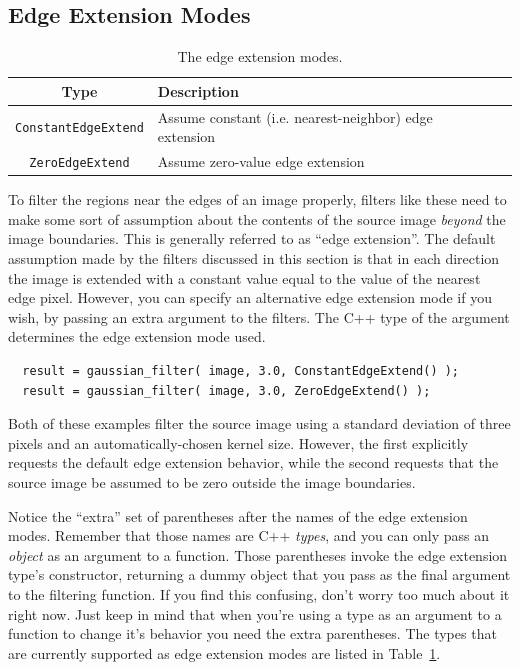 \subsection{Edge Extension Modes}
\label{sec:filter-edge-extend}

\begin{table}[t]\begin{centering}
\begin{tabular}{|c|l|l|} \hline
Type & Description \\ \hline \hline
\verb#ConstantEdgeExtend# & Assume constant (i.e. nearest-neighbor) edge extension \\ \hline
\verb#ZeroEdgeExtend# & Assume zero-value edge extension \\ \hline
\end{tabular}
\caption{The edge extension modes.}
\label{tbl:edge-extension-modes}
\end{centering}\end{table}

To filter the regions near the edges of an image properly, 
filters like these need to make some sort of assumption 
about the contents of the source image {\it beyond} the 
image boundaries.  This is generally referred to as ``edge 
extension''.  The default assumption made by the filters 
discussed in this section is that in each direction the 
image is extended with a constant value equal to the value 
of the nearest edge pixel.  However, you can specify an 
alternative edge extension mode if you wish, by passing 
an extra argument to the filters.  The C++ type of the 
argument determines the edge extension mode used.  
\begin{verbatim}
  result = gaussian_filter( image, 3.0, ConstantEdgeExtend() );
  result = gaussian_filter( image, 3.0, ZeroEdgeExtend() );
\end{verbatim}
Both of these examples filter the source image using a 
standard deviation of three pixels and an automatically-chosen 
kernel size.  However, the first explicitly requests the 
default edge extension behavior, while the second requests 
that the source image be assumed to be zero outside the 
image boundaries.

Notice the ``extra'' set of parentheses after the names 
of the edge extension modes.  Remember that those names are 
C++ {\it types}, and you can only pass an {\it object} as an 
argument to a function.  Those parentheses invoke the 
edge extension type's constructor, returning a dummy 
object that you pass as the final argument to the filtering 
function.  If you find this confusing, don't worry too much 
about it right now.  Just keep in mind that when you're 
using a type as an argument to a function to change it's 
behavior you need the extra parentheses.  The types that 
are currently supported as edge extension modes are listed 
in Table~\ref{tbl:edge-extension-modes}.

